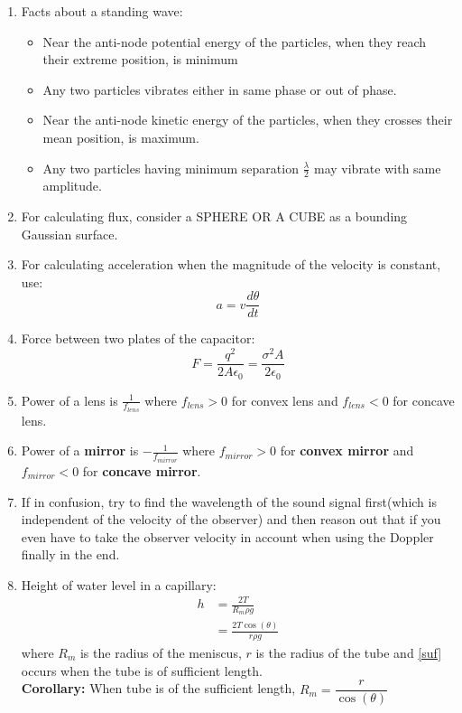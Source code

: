 \documentclass{article}
\numberwithin{equation}{section}
\numberwithin{figure}{section}
\begin{document}
\begin{enumerate}
	\item Facts about a standing wave:
		\begin{itemize}
			\item Near the anti-node potential energy of the particles, when they reach their extreme position, is minimum
			\item Any two particles vibrates either in same phase or out of phase.
			\item Near the anti-node kinetic energy of the particles, when they crosses their mean position, is maximum.
			\item Any two particles having minimum separation $\frac{\lambda}{2}$  may vibrate with same amplitude.
		\end{itemize}
	\item For calculating flux, consider a SPHERE OR A CUBE as a bounding Gaussian surface.
	\item For calculating acceleration when the magnitude of the velocity is constant, use:
		\begin{equation}
			a=v\frac{d\theta}{dt}
		\end{equation}
	\item Force between two plates of the capacitor:
		\begin{equation}
			F=\frac{q^2}{2A\epsilon_0}=\frac{\sigma^2 A}{2\epsilon_0}
		\end{equation}
	\item Power of a lens is $\frac{1}{f_{lens}}$ where $f_{lens}>0$ for convex lens and $f_{lens}<0$ for concave lens.
	\item Power of a \textbf{mirror} is $-\frac{1}{f_{mirror}}$ where $f_{mirror}>0$ for \textbf{convex mirror} and $f_{mirror}<0$ for \textbf{concave mirror}.
	\item If in confusion, try to find the wavelength of the sound signal first(which is independent of the velocity of the observer) and then reason out that if you even have to take the observer velocity in account when using the Doppler finally in the end.
	\item Height of water level in a capillary:
		\begin{align}
			h&=\frac{2T}{R_m \rho g}\\
			&=\frac{2T\cos(\theta)}{r \rho g}\label{suf}
		\end{align}
		where $R_m$ is the radius of the meniscus, $r$ is the radius of the tube  and \ref{suf} occurs when the tube is of sufficient length.\\
		\textbf{Corollary:} When tube is of the sufficient length, $R_m=\dfrac{r}{\cos(\theta)}$ 

\end{enumerate}
\end{document}

